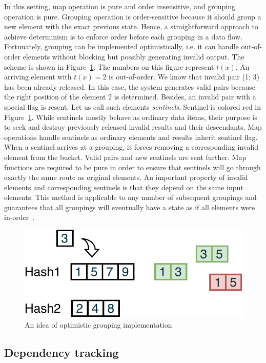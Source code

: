 In this setting, map operation is pure and order insensitive, and grouping operation is pure. Grouping operation is order-sensitive because it should group a new element with the exact previous state. Hence, a straightforward approach to achieve determinism is to enforce order before each grouping in a data flow. Fortunately, grouping can be implemented optimistically, i.e. it can handle out-of-order elements without blocking but possibly generating invalid output. The scheme is shown in Figure~\ref{optimistic-grouping}. The numbers on this figure represent $t(x)$. An arriving element with $t(x)=2$ is out-of-order. We know that invalid pair (1; 3) has been already released. In this case, the system generates valid pairs because the right position of the element 2 is determined. Besides, an invalid pair with a special flag is resent. Let us call such elements {\em sentinels}. Sentinel is colored red in Figure~\ref{optimistic-grouping}. While sentinels mostly behave as ordinary data items, their purpose is to seek and destroy previously released invalid results and their descendants. Map operations handle sentinels as ordinary elements and results inherit sentinel flag. When a sentinel arrives at a grouping, it forces removing a corresponding invalid element from the bucket. Valid pairs and new sentinels are sent further. Map functions are required to be pure in order to ensure that sentinels will go through exactly the same route as original elements. An important property of invalid elements and corresponding sentinels is that they depend on the same input elements. This method is applicable to any number of subsequent groupings and guarantees that all groupings will eventually have a state as if all elements were in-order~\cite{we2018adbis}.
 
\begin{figure}[htbp]
  \centering
  \includegraphics[width=.35\textwidth]{pics/grouping-invalidation}
  \caption{An idea of optimistic grouping implementation}
  \label {optimistic-grouping}
\end{figure} 

\subsection{Dependency tracking}

